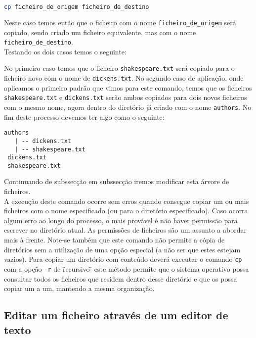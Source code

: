 \documentclass[a4paper, onecolumn, 10pt]{report}
\begin{document}
\begin{lstlisting}[language=bash, style=console]
cp ficheiro_de_origem ficheiro_de_destino
\end{lstlisting}

Neste caso temos então que o ficheiro com o nome \texttt{ficheiro\_de\_origem} será copiado, sendo criado um ficheiro equivalente, mas com o nome \texttt{ficheiro\_de\_destino}. \\
Testando os dois casos temos o seguinte:



No primeiro caso temos que o ficheiro \texttt{shakespeare.txt} será copiado para o ficheiro novo com o nome de \texttt{dickens.txt}. No segundo caso de aplicação, onde aplicamos o primeiro padrão que vimos para este comando, temos que os ficheiros \texttt{shakespeare.txt} e \texttt{dickens.txt} serão ambos copiados para dois novos ficheiros com o mesmo nome, agora dentro do diretório já criado com o nome \texttt{authors}. No fim deste processo devemos ter algo como o seguinte:

\begin{lstlisting}[style=console]
 authors
   | -- dickens.txt
   | -- shakespeare.txt
 dickens.txt
 shakespeare.txt
\end{lstlisting}

Continuando de subssecção em subssecção iremos modificar esta árvore de ficheiros. \\
A execução deste comando ocorre sem erros quando consegue copiar um ou mais ficheiros com o nome especificado (ou para o diretório especificado). Caso ocorra algum erro ao longo do processo, o mais provável é não haver permissão para escrever no diretório atual. As permissões de ficheiros são um assunto a abordar mais à frente. Note-se também que este comando não permite a cópia de diretórios sem a utilização de uma opção especial (a não ser que estes estejam vazios). Para copiar um
diretório com conteúdo deverá executar o comando \texttt{cp} com a opção \texttt{-r} de \"recursivo\" - este método permite que o sistema operativo possa consultar todos os ficheiros que residem dentro desse diretório e que os possa copiar um a um, mantendo a mesma organização.

\subsection{Editar um ficheiro através de um editor de texto}
\end{document}

